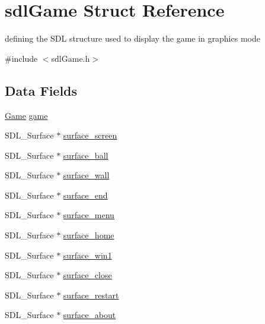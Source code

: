 \hypertarget{structsdl_game}{\section{sdl\-Game Struct Reference}
\label{structsdl_game}
}


defining the S\-D\-L structure used to display the game in graphics mode  




{\ttfamily \#include $<$sdl\-Game.\-h$>$}

\subsection*{Data Fields}
\begin{DoxyCompactItemize}
\item 
\hyperlink{struct_game}{Game} \hyperlink{structsdl_game_ac6a5ed6191fcf3a5bf0445921feb4f48}{game}
\item 
S\-D\-L\-\_\-\-Surface $\ast$ \hyperlink{structsdl_game_add1b6b922a3601ae4115805c3a41fa8d}{surface\-\_\-screen}
\item 
S\-D\-L\-\_\-\-Surface $\ast$ \hyperlink{structsdl_game_aecad219d2fd8802f95ef5b19542880c9}{surface\-\_\-ball}
\item 
S\-D\-L\-\_\-\-Surface $\ast$ \hyperlink{structsdl_game_a78af5dbd8ac60c62da4e1530b2f5d224}{surface\-\_\-wall}
\item 
S\-D\-L\-\_\-\-Surface $\ast$ \hyperlink{structsdl_game_a910871d96b4426f5729b94901bf9e0f6}{surface\-\_\-end}
\item 
S\-D\-L\-\_\-\-Surface $\ast$ \hyperlink{structsdl_game_a29c6542f0f27a5c7d75584b0332818b1}{surface\-\_\-menu}
\item 
S\-D\-L\-\_\-\-Surface $\ast$ \hyperlink{structsdl_game_a103a17f5a7a4b3f1db83e4e109871210}{surface\-\_\-home}
\item 
S\-D\-L\-\_\-\-Surface $\ast$ \hyperlink{structsdl_game_aea8a6e9c86a586df7bf3f2ad82c19b98}{surface\-\_\-win1}
\item 
S\-D\-L\-\_\-\-Surface $\ast$ \hyperlink{structsdl_game_ae44e97da75374b6f41f14486332e7dba}{surface\-\_\-close}
\item 
S\-D\-L\-\_\-\-Surface $\ast$ \hyperlink{structsdl_game_a33238e5f47ca5c025e8fbeeab80e6e13}{surface\-\_\-restart}
\item 
S\-D\-L\-\_\-\-Surface $\ast$ \hyperlink{structsdl_game_a3694e2c887e48ac072e001a1e6d7afed}{surface\-\_\-about}
\end{DoxyCompactItemize}



